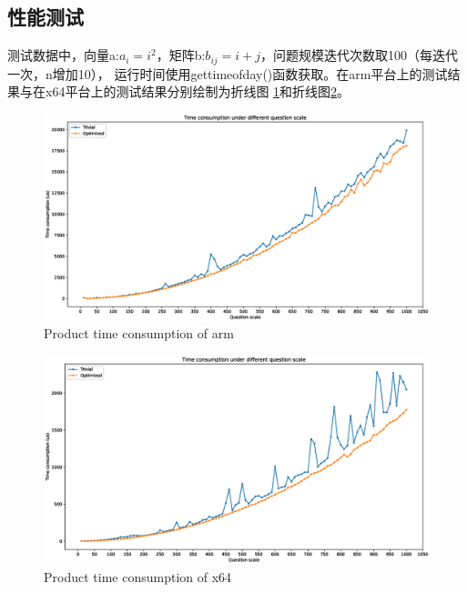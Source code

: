 \documentclass[12pt, a4paper, oneside]{ctexart}
\begin{document}
\subsection{性能测试}
测试数据中，向量a:$a_i = i^2$，矩阵b:$b_{ij} = i + j$，问题规模迭代次数取100（每迭代一次，n增加10），
运行时间使用gettimeofday()函数获取。在arm平台上的测试结果与在x64平台上的测试结果分别绘制为折线图
\ref{product_arm}和折线图\ref{product_x64}。
\begin{figure}[ht]
    \flushleft
    \includegraphics[scale = 0.5]{./picture/product_arm.eps}
    \caption{Product time consumption of arm}
    \label{product_arm}
\end{figure}
\begin{figure}[htbp]
    \flushleft
    \includegraphics[scale = 0.5]{./picture/product_x64.eps}
    \caption{Product time consumption of x64}
    \label{product_x64}
\end{figure}
\end{document}
